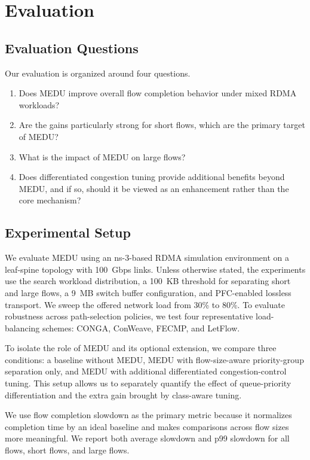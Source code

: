 \documentclass[conference]{IEEEtran}
\begin{document}
\section{Evaluation}

\subsection{Evaluation Questions}

Our evaluation is organized around four questions.

\begin{enumerate}
  \item Does MEDU improve overall flow completion behavior under mixed RDMA workloads?
  \item Are the gains particularly strong for short flows, which are the primary target of MEDU?
  \item What is the impact of MEDU on large flows?
  \item Does differentiated congestion tuning provide additional benefits beyond MEDU, and if so, should it be viewed as an enhancement rather than the core mechanism?
\end{enumerate}

\subsection{Experimental Setup}

We evaluate MEDU using an ns-3-based RDMA simulation environment on a leaf-spine topology with 100~Gbps links. Unless otherwise stated, the experiments use the search workload distribution, a 100~KB threshold for separating short and large flows, a 9~MB switch buffer configuration, and PFC-enabled lossless transport. We sweep the offered network load from 30\% to 80\%. To evaluate robustness across path-selection policies, we test four representative load-balancing schemes: CONGA, ConWeave, FECMP, and LetFlow.

To isolate the role of MEDU and its optional extension, we compare three conditions: a baseline without MEDU, MEDU with flow-size-aware priority-group separation only, and MEDU with additional differentiated congestion-control tuning. This setup allows us to separately quantify the effect of queue-priority differentiation and the extra gain brought by class-aware tuning.

We use flow completion slowdown as the primary metric because it normalizes completion time by an ideal baseline and makes comparisons across flow sizes more meaningful. We report both average slowdown and p99 slowdown for all flows, short flows, and large flows.
\end{document}

